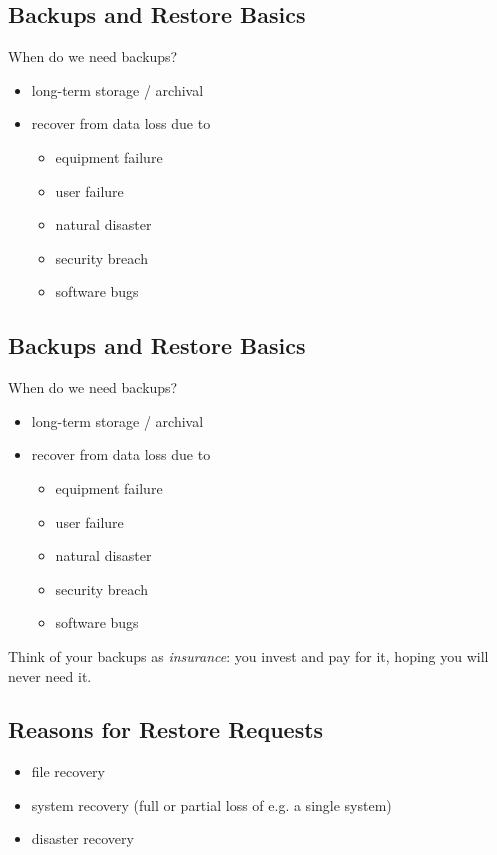 \documentclass[xga]{xdvislides}
\begin{document}
\subsection{Backups and Restore Basics}
When do we need backups?
\begin{itemize}
	\item long-term storage / archival
	\item recover from data loss due to
		\begin{itemize}
			\item equipment failure
			\item user failure
			\item natural disaster
			\item security breach
			\item software bugs
		\end{itemize}
\end{itemize}

\subsection{Backups and Restore Basics}
When do we need backups?
\begin{itemize}
	\item long-term storage / archival
	\item recover from data loss due to
		\begin{itemize}
			\item equipment failure
			\item user failure
			\item natural disaster
			\item security breach
			\item software bugs
		\end{itemize}
\end{itemize}
\addvspace{.5in}
Think of your backups as {\em insurance}:  you invest and pay for it, hoping
you will never need it.

\subsection{Reasons for Restore Requests}
\begin{itemize}
	\item file recovery
	\item system recovery (full or partial loss of e.g. a single system)
	\item disaster recovery
\end{itemize}
\end{document}
